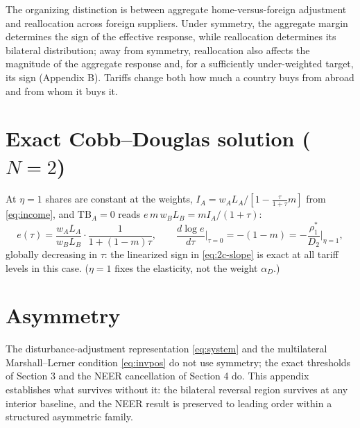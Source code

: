 \documentclass[11pt]{article}
\begin{document}
The organizing distinction is between aggregate home-versus-foreign adjustment and reallocation across foreign suppliers. Under symmetry, the aggregate margin determines the sign of the effective response, while reallocation determines its bilateral distribution; away from symmetry, reallocation also affects the magnitude of the aggregate response and, for a sufficiently under-weighted target, its sign (Appendix B). Tariffs change both how much a country buys from abroad and from whom it buys it.

\appendix

\section{Exact Cobb--Douglas solution ($N = 2$)}

At $\eta = 1$ shares are constant at the weights, $I_A = w_A L_A/[1 - \tfrac{\tau}{1+\tau}m]$ from \eqref{eq:income}, and $\mathrm{TB}_A = 0$ reads $e\, m\, w_B L_B = m I_A/(1+\tau)$:
\begin{equation}
e(\tau) = \frac{w_A L_A}{w_B L_B}\cdot \frac{1}{1 + (1-m)\tau},
\qquad
\frac{d\log e}{d\tau}\bigg|_{\tau=0} = -(1-m) = -\frac{\rho_1^*}{D_2}\bigg|_{\eta=1} ,
\label{eq:2c-exact}
\end{equation}
globally decreasing in $\tau$: the linearized sign in \eqref{eq:2c-slope} is exact at all tariff levels in this case. ($\eta = 1$ fixes the elasticity, not the weight $\alpha_D$.)

\section{Asymmetry}

The disturbance-adjustment representation \eqref{eq:system} and the multilateral Marshall--Lerner condition \eqref{eq:invpos} do not use symmetry; the exact thresholds of Section 3 and the NEER cancellation of Section 4 do. This appendix establishes what survives without it: the bilateral reversal region survives at any interior baseline, and the NEER result is preserved to leading order within a structured asymmetric family.
\end{document}
